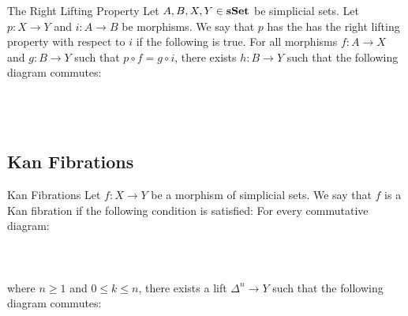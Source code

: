 \documentclass[a4paper]{article}
\begin{document}
\begin{defn}{The Right Lifting Property}{} Let $A,B,X,Y\in\bold{sSet}$ be simplicial sets. Let $p:X\to Y$ and $i:A\to B$ be morphisms. We say that $p$ has the has the right lifting property with respect to $i$ if the following is true. For all morphisms $f:A\to X$ and $g:B\to Y$ such that $p\circ f=g\circ i$, there exists $h:B\to Y$ such that the following diagram commutes: \\~\\
\\~\\
\end{defn}

\subsection{Kan Fibrations}
\begin{defn}{Kan Fibrations}{} Let $f:X\to Y$ be a morphism of simplicial sets. We say that $f$ is a Kan fibration if the following condition is satisfied: For every commutative diagram: \\~\\
\\~\\
where $n\geq 1$ and $0\leq k\leq n$, there exists a lift $\Delta^n\to Y$ such that the following diagram commutes: \\~\\
\\~\\
\end{defn}
\end{document}
